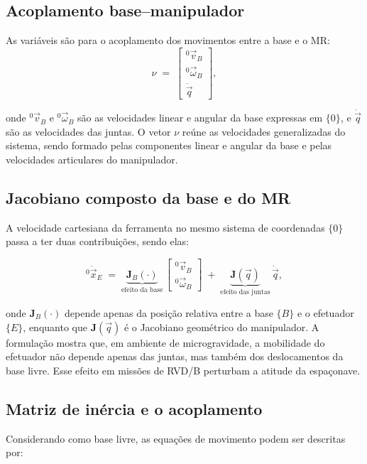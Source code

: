 \subsection{Acoplamento base--manipulador}
\label{sec:acoplamento_base_manipulador}

As variáveis são para o acoplamento dos movimentos entre a base e o MR:
\begin{equation}
\label{eq:nu_def}
\nu
\;=\;
\begin{bmatrix}
{}^{0}\!\vec v_{B} \\[2pt]
{}^{0}\!\vec \omega_{B} \\[2pt]
\dot{\vec q}
\end{bmatrix},
\end{equation}

onde ${}^{0}\!\vec v_{B}$ e ${}^{0}\!\vec \omega_{B}$ são as velocidades linear e angular da base expressas em $\{0\}$, e
$\dot{\vec q}$ são as velocidades das juntas.
O vetor $\nu$ reúne as velocidades generalizadas do sistema, sendo formado pelas componentes linear e angular da base e pelas velocidades articulares do manipulador.

\subsection{Jacobiano composto da base e do MR}
A velocidade cartesiana da ferramenta no mesmo sistema de coordenadas $\{0\}$ passa a ter duas contribuições, sendo elas:

\begin{equation}
\label{eq:xdot_composto}
{}^{0}\!\dot{\vec x}_{E}
\;=\;
\underbrace{\mathbf{J}_{\!B}(\cdot)}_{\text{efeito da base}}\,
\begin{bmatrix}
{}^{0}\!\vec v_{B} \\
{}^{0}\!\vec \omega_{B}
\end{bmatrix}
\;+\;
\underbrace{\mathbf{J}(\vec q)}_{\text{efeito das juntas}}\,\dot{\vec q},
\end{equation}

onde $\mathbf{J}_{\!B}(\cdot)$ depende apenas da posição relativa entre a base $\{B\}$ e
o efetuador $\{E\}$, enquanto que
$\mathbf{J}(\vec q)$ é o Jacobiano geométrico do manipulador.
A formulação mostra que, em ambiente de microgravidade, a mobilidade do efetuador não depende apenas das juntas, 
mas também dos deslocamentos da base livre. 
Esse efeito em missões de RVD/B perturbam a atitude da espaçonave.

\subsection{Matriz de inércia e o acoplamento}
Considerando como base livre, as equações de movimento podem ser descritas por:


